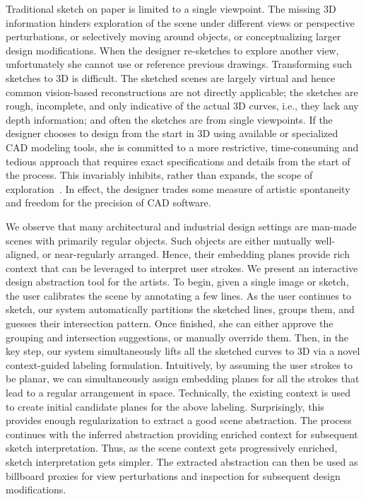 Traditional sketch on paper is limited to a single viewpoint. The missing 3D information hinders exploration of the scene under different views or perspective perturbations, or selectively moving around objects, or conceptualizing larger design modifications.  When the designer re-sketches to explore another view, unfortunately she cannot use or reference previous drawings. Transforming such sketches to 3D is difficult. The sketched scenes are largely virtual and hence common vision-based reconstructions are not directly applicable; the sketches are rough, incomplete, and only indicative of the actual 3D curves, i.e., they lack any depth information; and often the sketches are from single viewpoints. If the designer chooses to design from the start in 3D using available or specialized CAD modeling tools, she is committed to a more restrictive, time-consuming and tedious approach that requires exact specifications and details from the start of the process. This invariably inhibits, rather than expands, the scope of exploration~\cite{sketchBook:11}. In effect, the designer trades some measure of artistic spontaneity and freedom for the precision of CAD software.

We observe that many architectural and industrial design settings are man-made scenes with primarily regular objects. Such objects are either mutually well-aligned, or near-regularly arranged. Hence, their embedding planes provide rich context that can be leveraged to interpret user strokes. We present an interactive design abstraction tool for the artists. To begin, given a single image or sketch, the user calibrates the scene by annotating a few lines. As the user continues to sketch, our system automatically partitions the sketched lines, groups them, and guesses their intersection pattern. Once finished, she can either approve the grouping and intersection suggestions, or manually override them. Then, in the key step, our system simultaneously lifts all the sketched curves to 3D via a novel context-guided labeling formulation. Intuitively, by assuming the user strokes to be planar, we can simultaneously assign embedding planes for all the strokes that lead to a regular arrangement in space. Technically, the existing context is used to create initial candidate planes for the above labeling. Surprisingly, this provides enough regularization to extract a good scene abstraction. The process continues with the inferred abstraction providing enriched context for subsequent sketch interpretation. Thus, as the scene context gets progressively enriched, sketch interpretation gets simpler. The extracted abstraction can then be used as billboard proxies for view perturbations and  inspection for subsequent design modifications.

